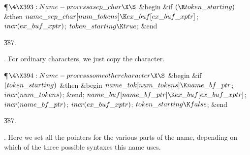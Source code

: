 \Y\P$\4\X393:Name-process a \\{sep\_char}\X\S$\6
\&{begin} \&{if} $(\R\\{token\_starting})$ \1\&{then}\5
$\\{name\_sep\_char}[\\{num\_tokens}]\K\\{ex\_buf}[\\{ex\_buf\_xptr}]$;\2\6
$\\{incr}(\\{ex\_buf\_xptr})$;\5
$\\{token\_starting}\K\\{true}$;\6
\&{end}\par
\U387.\fi

.
For ordinary characters, we just copy the character.

\Y\P$\4\X394:Name-process some other character\X\S$\6
\&{begin} \&{if} $(\\{token\_starting})$ \1\&{then}\6
\&{begin} $\\{name\_tok}[\\{num\_tokens}]\K\\{name\_bf\_ptr}$;\5
$\\{incr}(\\{num\_tokens})$;\6
\&{end};\2\6
$\\{name\_buf}[\\{name\_bf\_ptr}]\K\\{ex\_buf}[\\{ex\_buf\_xptr}]$;\5
$\\{incr}(\\{name\_bf\_ptr})$;\5
$\\{incr}(\\{ex\_buf\_xptr})$;\5
$\\{token\_starting}\K\\{false}$;\6
\&{end}\par
\U387.\fi

.
Here we set all the pointers for the various parts of the name,
depending on which of the three possible syntaxes this name uses.

